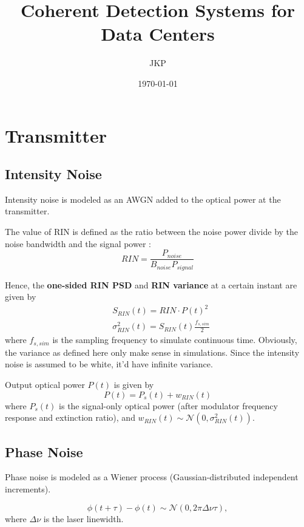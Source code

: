 \documentclass[a4paper]{article}
\title{Coherent Detection Systems for Data Centers}
\author{JKP}
\date{\today}
\begin{document}
\maketitle

\section{Transmitter}
\subsection{Intensity Noise}
Intensity noise is modeled as an AWGN added to the optical power at the transmitter.

The value of RIN is defined as the ratio between the noise power divide by the noise bandwidth and the signal power \cite{agilent-RIN-measurement}: 
\begin{equation}
RIN = \frac{P_{noise}}{B_{noise}P_{signal}}
\end{equation}

Hence, the \textbf{one-sided RIN PSD} and \textbf{RIN variance} at a certain instant are given by
\begin{align}
& S_{RIN}(t) = RIN\cdot P(t)^2 \\
& \sigma^2_{RIN}(t) = S_{RIN}(t)\frac{f_{s, sim}}{2}
\end{align}
where $f_{s, sim}$ is the sampling frequency to simulate continuous time. Obviously, the variance as defined here only make sense in simulations. Since the intensity noise is assumed to be white, it'd have infinite variance.

Output optical power $P(t)$ is given by
\begin{equation}
P(t) = P_s(t) + w_{RIN}(t)
\end{equation}
where $P_s(t)$ is the signal-only optical power (after modulator frequency response and extinction ratio), and $w_{RIN}(t)\sim\mathcal{N}(0, \sigma^2_{RIN}(t))$.

\subsection{Phase Noise}
Phase noise is modeled as a Wiener process (Gaussian-distributed independent increments).

\begin{equation}
\phi(t+\tau) - \phi(t) \sim\mathcal{N}(0, 2\pi\Delta\nu\tau),
\end{equation} 
where $\Delta\nu$ is the laser linewidth. 
\end{document}

